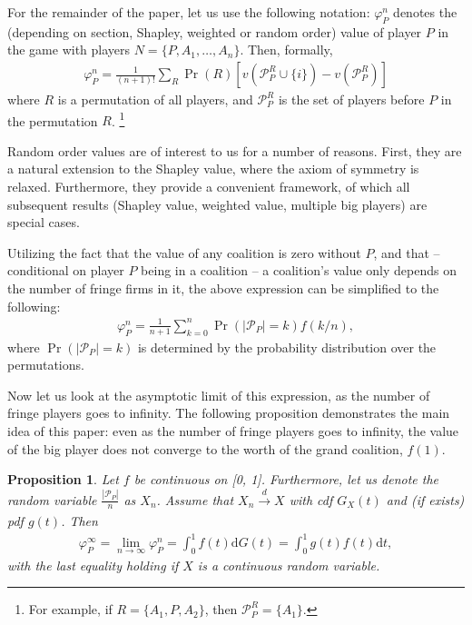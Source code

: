 \documentclass[a4paper]{article}
\newtheorem{proposition}{Proposition}
\newcommand{\dt}{\mathrm{d}t}
\newcommand{\dG}{\mathrm{d}G}
\begin{document}
For the remainder of the paper, let us use the following notation: $\varphi_P^n$ denotes the (depending on section, Shapley, weighted or random order) value of player $P$ in the game with players $N = \{P, A_1, \dots, A_n\}$.
Then, formally,
\begin{align*}
    \varphi_P^n = \frac{1}{(n+1)!} \sum_{R} \Pr(R) [ v(\mathcal{P}_P^R \cup \{i\}) - v(\mathcal{P}_P^R) ]
\end{align*}
where $R$ is a permutation of all players, and $\mathcal{P}_P^R$ is the set of players before $P$ in the permutation $R$. \footnote{
    For example, if $R = \{A_1, P, A_2\}$, then $\mathcal{P}_P^R = \{A_1\}$.
}

Random order values are of interest to us for a number of reasons.
First, they are a natural extension to the Shapley value, where the axiom of symmetry is relaxed.
Furthermore, they provide a convenient framework, of which all subsequent results (Shapley value, weighted value, multiple big players) are special cases.

Utilizing the fact that the value of any coalition is zero without $P$, and that -- conditional on player $P$ being in a coalition -- a coalition's value only depends on the number of fringe firms in it, the above expression can be simplified to the following:
\begin{align*}
    \varphi_P^n = \frac{1}{n+1} \sum_{k=0}^n \Pr(|\mathcal{P}_P| = k) f(k/n),
\end{align*}
where $\Pr(|\mathcal{P}_P| = k)$ is determined by the probability distribution over the permutations.

Now let us look at the asymptotic limit of this expression, as the number of fringe players goes to infinity.
The following proposition demonstrates the main idea of this paper: even as the number of fringe players goes to infinity, the value of the big player does not converge to the worth of the grand coalition, $f(1)$.

\begin{proposition}
    \label{prop:one_sided_general}
    Let $f$ be continuous on [0, 1]. Furthermore, let us denote the random variable $\frac{|\mathcal{P}_P|}{n}$ as $X_n$. Assume that $X_n \xrightarrow[]{d} X$ with cdf $G_X(t)$ and (if exists) pdf $g(t)$.
    Then
    \begin{align*}
        \varphi_P^\infty = \lim_{n \to \infty} \varphi_P^n = \int_0^1 f(t) \dG(t) = \int_0^1 g(t) f(t) \dt,
    \end{align*}
    with the last equality holding if $X$ is a continuous random variable.
\end{proposition}
\end{document}
